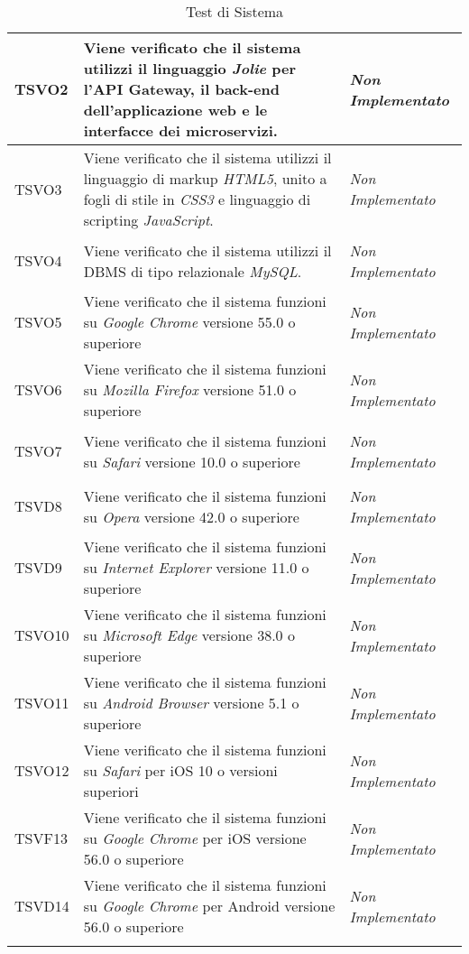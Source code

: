 \begin{longtable}{|>{\centering\arraybackslash}p{2.3cm}|>{\centering\arraybackslash}p{7.5cm} | >{\centering\arraybackslash}p{3.8cm}|}
		\hypertarget{TSVO2}{TSVO2} & Viene verificato che il sistema utilizzi il linguaggio \textit{Jolie} per l'API Gateway, il back-end dell'applicazione web e le interfacce dei microservizi. & \textit{Non Implementato}\\ \hline
		\hypertarget{TSVO3}{TSVO3} & Viene verificato che il sistema utilizzi il linguaggio di markup \textit{HTML5}, unito a fogli di stile in \textit{CSS3} e linguaggio di scripting \textit{JavaScript}. & \textit{Non Implementato}\\ \hline
		\hypertarget{TSVO4}{TSVO4} & Viene verificato che il sistema utilizzi il DBMS di tipo relazionale \textit{MySQL}. & \textit{Non Implementato}\\ \hline
		\hypertarget{TSVO5}{TSVO5} & Viene verificato che il sistema funzioni su \textit{Google Chrome} versione 55.0 o superiore & \textit{Non Implementato}\\ \hline
		\hypertarget{TSVO6}{TSVO6} & Viene verificato che il sistema funzioni su \textit{Mozilla Firefox} versione 51.0 o superiore & \textit{Non Implementato}\\ \hline
		\hypertarget{TSVO7}{TSVO7} & Viene verificato che il sistema funzioni su \textit{Safari} versione 10.0 o superiore & \textit{Non Implementato}\\ \hline
		\hypertarget{TSVD8}{TSVD8} & Viene verificato che il sistema funzioni su \textit{Opera} versione 42.0 o superiore & \textit{Non Implementato}\\ \hline
		\hypertarget{TSVD9}{TSVD9} & Viene verificato che il sistema funzioni su \textit{Internet Explorer} versione 11.0 o superiore & \textit{Non Implementato}\\ \hline
		\hypertarget{TSVO10}{TSVO10} & Viene verificato che il sistema funzioni su \textit{Microsoft Edge} versione 38.0 o superiore & \textit{Non Implementato}\\ \hline
		\hypertarget{TSVO11}{TSVO11} & Viene verificato che il sistema funzioni su \textit{Android Browser} versione 5.1 o superiore & \textit{Non Implementato}\\ \hline
		\hypertarget{TSVO12}{TSVO12} & Viene verificato che il sistema funzioni su \textit{Safari} per iOS 10 o versioni superiori & \textit{Non Implementato}\\ \hline
		\hypertarget{TSVF13}{TSVF13} & Viene verificato che il sistema funzioni su \textit{Google Chrome} per iOS versione 56.0 o superiore & \textit{Non Implementato}\\ \hline
		\hypertarget{TSVD14}{TSVD14} & Viene verificato che il sistema funzioni su \textit{Google Chrome} per Android versione 56.0 o superiore & \textit{Non Implementato}\\ \hline
		\caption[Test di Sistema]{Test di Sistema}
		\label{tabella:test1}
	\end{longtable}
	\clearpage
	
